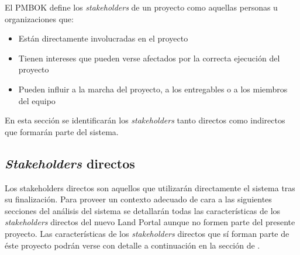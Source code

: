 El PMBOK \cite{pmi:pmbok} define los \textit{stakeholders} de un proyecto como aquellas personas u organizaciones que:
\begin{itemize}
\item Están directamente involucradas en el proyecto
\item Tienen intereses que pueden verse afectados por la correcta ejecución del proyecto
\item Pueden influir a la marcha del proyecto, a los entregables o a los miembros del equipo
\end{itemize}

En esta sección se identificarán los \textit{stakeholders} tanto directos como indirectos que formarán parte del sistema.


\subsection{\textit{Stakeholders} directos}
Los stakeholders directos son aquellos que utilizarán directamente el sistema tras su finalización.  Para proveer un contexto adecuado de cara a las siguientes secciones del análisis del sistema se detallarán todas las características de los \textit{stakeholders} directos del nuevo Land Portal aunque no formen parte del presente proyecto.  Las características de los \textit{stakeholders} directos que sí forman parte de éste proyecto podrán verse con detalle a continuación en la sección de .

